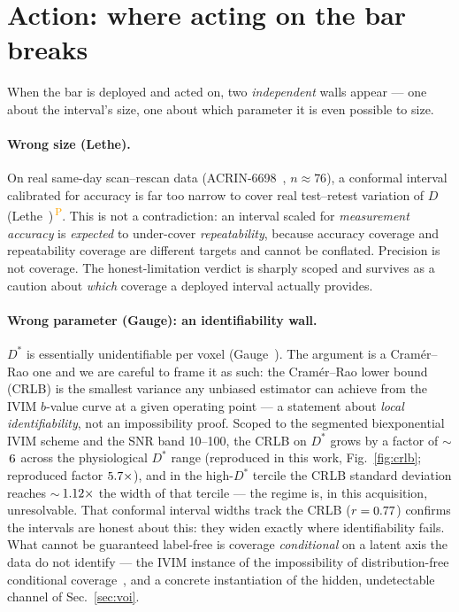\documentclass[11pt]{article}
\newcommand{\Dstar}{D^{*}}
\newcommand{\PROV}{\textsuperscript{\textcolor{orange}{\,P}}}
\begin{document}
\section{Action: where acting on the bar breaks}\label{sec:action}
When the bar is deployed and acted on, two \emph{independent} walls appear --- one about the
interval's size, one about which parameter it is even possible to size.

\paragraph{Wrong size (Lethe).}\label{par:lethe}
On real same-day scan--rescan data (ACRIN-6698~\citep{acrin6698}, $n\approx76$), a conformal
interval calibrated for accuracy is far too narrow to cover real test--retest variation of $D$
(Lethe~\citep{lethe})\PROV{}. This is not a contradiction: an interval scaled for
\emph{measurement accuracy} is \emph{expected} to under-cover \emph{repeatability}, because
accuracy coverage and repeatability coverage are different targets and cannot be conflated.
Precision is not coverage. The honest-limitation verdict is sharply scoped and survives as a
caution about \emph{which} coverage a deployed interval actually provides.

\paragraph{Wrong parameter (Gauge): an identifiability wall.}\label{par:gauge}
$\Dstar$ is essentially unidentifiable per voxel (Gauge~\citep{gauge}). The argument is a
Cram\'er--Rao one and we are careful to frame it as such: the Cram\'er--Rao lower bound (CRLB) is
the smallest variance any unbiased estimator can achieve from the IVIM $b$-value curve at a given
operating point --- a statement about \emph{local identifiability}, not an impossibility proof.
Scoped to the segmented biexponential IVIM scheme and the SNR band 10--100, the CRLB on $\Dstar$
grows by a factor of $\sim$\,$6$ across the physiological $\Dstar$ range (reproduced
in this work, Fig.~\ref{fig:crlb}; reproduced factor $5.7\times$), and in the
high-$\Dstar$ tercile the CRLB standard deviation reaches $\sim$\,$1.12\times$ the
width of that tercile --- the regime is, in this acquisition, unresolvable. That conformal
interval widths track the CRLB ($r=0.77$) confirms the intervals are honest about this:
they widen exactly where identifiability fails. What cannot be guaranteed label-free is coverage
\emph{conditional} on a latent axis the data do not identify --- the IVIM instance of the
impossibility of distribution-free conditional coverage~\citep{barber2021limits}, and a concrete
instantiation of the hidden, undetectable channel of Sec.~\ref{sec:voi}.
\end{document}

